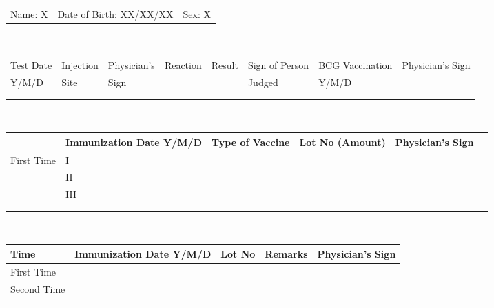 \documentclass[10pt]{article}
\newcommand{\tablefontsize}{\small}
\begin{document}
\noindent
{\small
\begin{tabular}{lll}
Name: X & Date of Birth: XX/XX/XX & Sex: X
\end{tabular}
}

\vspace{0.8cm}

\\[0.2cm]
{\tablefontsize
\begin{tabular}{|l|l|l|l|l|l||l|p{3.5cm}|}
\hline
\rowcolor{lightgray}
Test Date & Injection & Physician's & Reaction & Result & Sign of Person & BCG Vaccination & Physician's Sign \\
\rowcolor{lightgray}
Y/M/D & Site & Sign & & & Judged & Y/M/D & \\
\hline
      &      &      & &  &       & & \\
 &    &      & &   &  &   & \\
\hline
\end{tabular}
}

\vspace{0.8cm}

\\[0.2cm]
{\tablefontsize
\begin{tabular}{|l|l|l|l|l|l|}
\hline
\rowcolor{lightgray}
\multicolumn{2}{|l|}{Tim} & Immunization Date Y/M/D & Type of Vaccine & Lot No (Amount) & Physician's Sign \\
\hline
\multirow{3}{*}{First Time} & I &  &  &  & \\
\cline{2-6}
& II &           &     &                  & \\
\cline{2-6}
& III &           &     &                  & \\
\hline
            & &            & &   &                            \\
\hline
            & &           &  &  & \\
\hline
\end{tabular}
}

\vspace{0.8cm}

\\[0.2cm]
{\tablefontsize
\begin{tabular}{|l|l|l|l|l|}
\hline
\rowcolor{lightgray}
Time & Immunization Date Y/M/D & Lot No & Remarks & Physician's Sign \\
\hline
First Time &            & & & \\
\hline
Second Time &           & & & \\
            &           & & & \\
\hline
\end{tabular}
}
\end{document}
